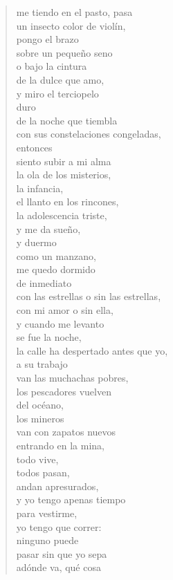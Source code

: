 \documentclass[12pt]{article}
\begin{document}
\begin{verse}
{me tiendo en el pasto, pasa\\
un insecto color de violín,\\
pongo el brazo\\
sobre un pequeño seno\\
o bajo la cintura\\
de la dulce que amo,\\
y miro el terciopelo\\
duro\\
de la noche que tiembla\\
con sus constelaciones congeladas,\\
entonces\\
siento subir a mi alma\\
la ola de los misterios,\\
la infancia,\\
el llanto en los rincones,\\
la adolescencia triste,\\
y me da sueño,\\
y duermo\\
como un manzano,\\
me quedo dormido\\
de inmediato\\
con las estrellas o sin las estrellas,\\
con mi amor o sin ella,\\
y cuando me levanto\\
se fue la noche,\\
la calle ha despertado antes que yo,\\
a su trabajo\\
van las muchachas pobres,\\
los pescadores vuelven\\
del océano,\\
los mineros\\
van con zapatos nuevos\\
entrando en la mina,\\
todo vive,\\
todos pasan,\\
andan apresurados,\\
y yo tengo apenas tiempo\\
para vestirme,\\
yo tengo que correr:\\
ninguno puede\\
pasar sin que yo sepa\\
adónde va, qué cosa\\
}
\end{verse}
\end{document}
